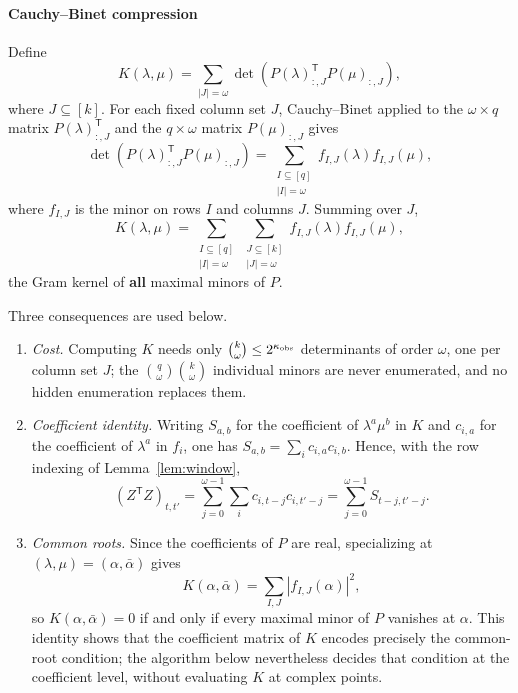 \paragraph*{Cauchy--Binet compression}\label{sec:cb}
Define
\[
K(\lambda,\mu)=\sum_{|J|=\omega}
\det\left(P(\lambda)_{:,J}^{\mathsf T}P(\mu)_{:,J}\right),
\]
where $J\subseteq[k]$. For each fixed column set $J$, Cauchy--Binet applied
to the $\omega\times q$ matrix $P(\lambda)_{:,J}^{\mathsf T}$ and the
$q\times\omega$ matrix $P(\mu)_{:,J}$ gives
\[
\det\!\left(P(\lambda)_{:,J}^{\mathsf T}P(\mu)_{:,J}\right)
=\sum_{\substack{I\subseteq[q]\\ |I|=\omega}}
f_{I,J}(\lambda)f_{I,J}(\mu),
\]
where $f_{I,J}$ is the minor on rows $I$ and columns $J$. Summing over $J$,
\[
K(\lambda,\mu)=\sum_{\substack{I\subseteq[q]\\ |I|=\omega}}
\sum_{\substack{J\subseteq[k]\\ |J|=\omega}}
f_{I,J}(\lambda)f_{I,J}(\mu),
\]
the Gram kernel of \textbf{all} maximal minors of $P$.

Three consequences are used below.
\begin{enumerate}[label=(\roman*)]
	\item\label{item:cost} \emph{Cost.} Computing $K$ needs only
	$\binom{k}{\omega}\le2^{\kappa_{\rm obs}}$ determinants of order
	$\omega$, one per column set $J$; the
	$\binom q\omega\binom k\omega$ individual minors are never enumerated,
	and no hidden enumeration replaces them.
	\item\label{item:coef} \emph{Coefficient identity.} Writing $S_{a,b}$
	for the coefficient of $\lambda^a\mu^b$ in $K$ and $c_{i,a}$ for the
	coefficient of $\lambda^a$ in $f_i$, one has
	$S_{a,b}=\sum_i c_{i,a}c_{i,b}$. Hence, with the row indexing of
	Lemma~\ref{lem:window},
	\[
	(Z^{\mathsf T}Z)_{t,t'}
	=\sum_{j=0}^{\omega-1}\sum_i c_{i,t-j}c_{i,t'-j}
	=\sum_{j=0}^{\omega-1}S_{t-j,t'-j}.
	\]
	\item\label{item:roots} \emph{Common roots.} Since the coefficients of
	$P$ are real, specializing at $(\lambda,\mu)=(\alpha,\bar\alpha)$ gives
	\[
	K(\alpha,\bar\alpha)
	=\sum_{I,J}\left|f_{I,J}(\alpha)\right|^2,
	\]
	so $K(\alpha,\bar\alpha)=0$ if and only if every maximal minor of $P$
	vanishes at $\alpha$. This identity shows that the coefficient matrix of
	$K$ encodes precisely the common-root condition; the algorithm below
	nevertheless decides that condition at the coefficient level, without
	evaluating $K$ at complex points.
\end{enumerate}

